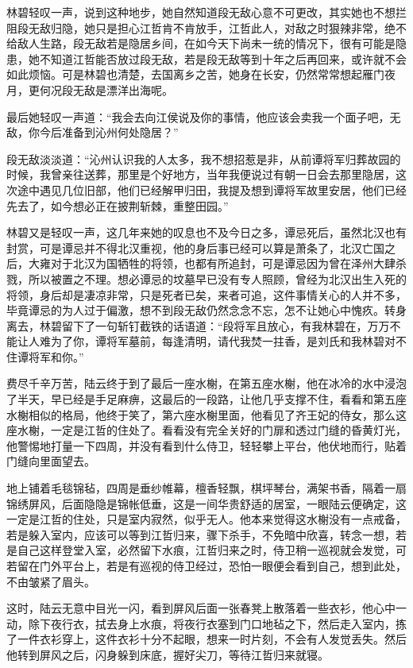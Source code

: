 林碧轻叹一声，说到这种地步，她自然知道段无敌心意不可更改，其实她也不想拦阻段无敌归隐，她只是担心江哲肯不肯放手，江哲此人，对敌之时狠辣非常，绝不给敌人生路，段无敌若是隐居乡间，在如今天下尚未一统的情况下，很有可能是隐患，她不知道江哲能否放过段无敌，若是段无敌等到十年之后再回来，或许就不会如此烦恼。可是林碧也清楚，去国离乡之苦，她身在长安，仍然常常想起雁门夜月，更何况段无敌是漂洋出海呢。

最后她轻叹一声道：“我会去向江侯说及你的事情，他应该会卖我一个面子吧，无敌，你今后准备到沁州何处隐居？”

段无敌淡淡道：“沁州认识我的人太多，我不想招惹是非，从前谭将军归葬故园的时候，我曾亲往送葬，那里是个好地方，当年我便说过有朝一日会去那里隐居，这次途中遇见几位旧部，他们已经解甲归田，我提及想到谭将军故里安居，他们已经先去了，如今想必正在披荆斩棘，重整田园。”

林碧又是轻叹一声，这几年来她的叹息也不及今日之多，谭忌死后，虽然北汉也有封赏，可是谭忌并不得北汉重视，他的身后事已经可以算是萧条了，北汉亡国之后，大雍对于北汉为国牺牲的将领，也都有所追封，可是谭忌因为曾在泽州大肆杀戮，所以被置之不理。想必谭忌的坟墓早已没有专人照顾，曾经为北汉出生入死的将领，身后却是凄凉非常，只是死者已矣，来者可追，这件事情关心的人并不多，毕竟谭忌的为人过于偏激，想不到段无敌仍然念念不忘，怎不让她心中愧疚。转身离去，林碧留下了一句斩钉截铁的话语道：“段将军且放心，有我林碧在，万万不能让人难为了你，谭将军墓前，每逢清明，请代我焚一拄香，是刘氏和我林碧对不住谭将军和你。”

费尽千辛万苦，陆云终于到了最后一座水榭，在第五座水榭，他在冰冷的水中浸泡了半天，早已经是手足麻痹，这最后的一段路，让他几乎支撑不住，看看和第五座水榭相似的格局，他终于笑了，第六座水榭里面，他看见了齐王妃的侍女，那么这座水榭，一定是江哲的住处了。看看没有完全关好的门扉和透过门缝的昏黄灯光，他警惕地打量一下四周，并没有看到什么侍卫，轻轻攀上平台，他伏地而行，贴着门缝向里面望去。

地上铺着毛毯锦毡，四周是垂纱帷幕，檀香轻飘，棋坪琴台，满架书香，隔着一扇锦绣屏风，后面隐隐是锦帐低垂，这是一间华贵舒适的居室，一眼陆云便确定，这一定是江哲的住处，只是室内寂然，似乎无人。他本来觉得这水榭没有一点戒备，若是躲入室内，应该可以等到江哲归来，骤下杀手，不免暗中欣喜，转念一想，若是自己这样登堂入室，必然留下水痕，江哲归来之时，侍卫稍一巡视就会发觉，可若留在门外平台上，若是有巡视的侍卫经过，恐怕一眼便会看到自己，想到此处，不由皱紧了眉头。

这时，陆云无意中目光一闪，看到屏风后面一张春凳上散落着一些衣衫，他心中一动，除下夜行衣，拭去身上水痕，将夜行衣塞到门口地毡之下，然后走入室内，拣了一件衣衫穿上，这件衣衫十分不起眼，想来一时片刻，不会有人发觉丢失。然后他转到屏风之后，闪身躲到床底，握好尖刀，等待江哲归来就寝。

